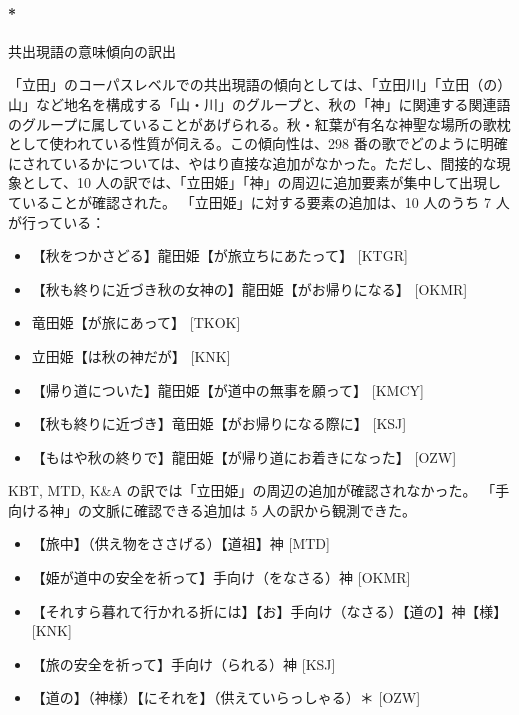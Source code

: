 \documentclass[
  letterpaper,
  DIV=11,
  numbers=noendperiod]{scrartcl}
\let\oldparagraph\paragraph
\renewcommand{\paragraph}[1]{\oldparagraph{#1}\mbox{}}
\providecommand{\tightlist}{%
  \setlength{\itemsep}{0pt}\setlength{\parskip}{0pt}}\usepackage{longtable,booktabs,array}
\begin{document}
\paragraph*{共出現語の意味傾向の訳出}\label{ux5171ux51faux73feux8a9eux306eux610fux5473ux50beux5411ux306eux8a33ux51fa}

「立田」のコーパスレベルでの共出現語の傾向としては、「立田川」「立田（の）山」など地名を構成する「山・川」のグループと、秋の「神」に関連する関連語のグループに属していることがあげられる。秋・紅葉が有名な神聖な場所の歌枕として使われている性質が伺える。この傾向性は、298
番の歌でどのように明確にされているかについては、やはり直接な追加がなかった。ただし、間接的な現象として、10
人の訳では、「立田姫」「神」の周辺に追加要素が集中して出現していることが確認された。
「立田姫」に対する要素の追加は、10 人のうち 7 人が行っている：

\begin{itemize}
\tightlist
\item
  【秋をつかさどる】龍田姫【が旅立ちにあたって】 {[}KTGR{]}
\item
  【秋も終りに近づき秋の女神の】龍田姫【がお帰りになる】 {[}OKMR{]}
\item
  竜田姫【が旅にあって】 {[}TKOK{]}
\item
  立田姫【は秋の神だが】 {[}KNK{]}
\item
  【帰り道についた】龍田姫【が道中の無事を願って】 {[}KMCY{]}
\item
  【秋も終りに近づき】竜田姫【がお帰りになる際に】 {[}KSJ{]}
\item
  【もはや秋の終りで】龍田姫【が帰り道にお着きになった】 {[}OZW{]}
\end{itemize}

KBT, MTD, K\&A の訳では「立田姫」の周辺の追加が確認されなかった。
「手向ける神」の文脈に確認できる追加は 5 人の訳から観測できた。

\begin{itemize}
\tightlist
\item
  【旅中】（供え物をささげる）【道祖】神 {[}MTD{]}
\item
  【姫が道中の安全を祈って】手向け（をなさる）神 {[}OKMR{]}
\item
  【それすら暮れて行かれる折には】【お】手向け（なさる）【道の】神【様】
  {[}KNK{]}
\item
  【旅の安全を祈って】手向け（られる）神 {[}KSJ{]}
\item
  【道の】（神様）【にそれを】（供えていらっしゃる）＊ {[}OZW{]}
\end{itemize}
\end{document}
